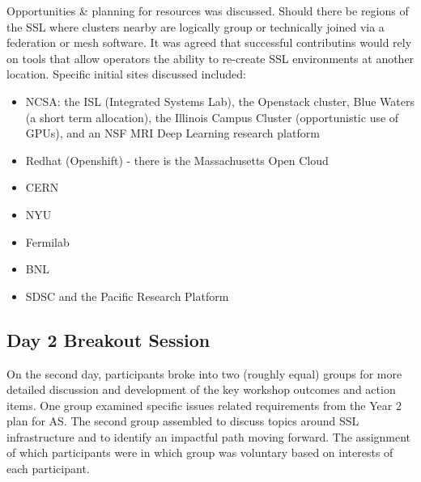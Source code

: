 \documentclass[11pt,letterpaper,fleqn]{article}
\begin{document}
Opportunities \& planning for resources was discussed.  Should there be regions of the SSL where clusters nearby are logically group or technically joined via a federation or mesh software. It was agreed that successful contributins would rely on tools that allow operators the ability to re-create SSL environments at another location.  Specific initial sites discussed included:
\begin{itemize}
  \item NCSA: the ISL (Integrated Systems Lab), the Openstack cluster, Blue Waters (a short term allocation), the Illinois Campus Cluster (opportunistic use of GPUs), and an NSF MRI Deep Learning research platform
  \item Redhat (Openshift) - there is the Massachusetts Open Cloud
  \item CERN
  \item NYU
  \item Fermilab
  \item BNL
  \item SDSC and the Pacific Research Platform
\end{itemize}

\subsection{Day 2 Breakout Session}
\vspace{0.2cm}
On the second day, participants broke into two (roughly equal) groups for more detailed discussion and development of the key workshop outcomes and action items. One group examined specific issues related requirements from the Year 2 plan for AS. The second group assembled to discuss topics around SSL infrastructure and to identify an impactful path moving forward. The assignment of which participants were in which group was voluntary based on interests of each participant.
\end{document}
